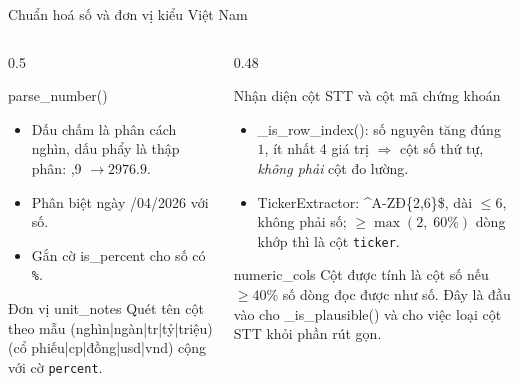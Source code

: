\documentclass[aspectratio=169,11pt]{beamer}
\newcommand{\src}[1]{{\footnotesize\ttfamily #1}}
\begin{document}
\begin{frame}{Chuẩn hoá số và đơn vị kiểu Việt Nam}
  \begin{columns}[T]
    \begin{column}{0.5\textwidth}
      \begin{block}{\small \src{parse\_number()}}
        \begin{itemize}\footnotesize
          \item Dấu chấm là phân cách nghìn, dấu phẩy là thập phân:
                \src{2.976,9} $\rightarrow 2976.9$.
          \item Phân biệt ngày \src{22/04/2026} với số.
          \item Gắn cờ \src{is\_percent} cho số có \texttt{\%}.
        \end{itemize}
      \end{block}
      \begin{block}{\small Đơn vị \src{unit\_notes}}
        Quét tên cột theo mẫu \src{(nghìn|ngàn|tr|tỷ|triệu) (cổ phiếu|cp|đồng|usd|vnd)}
        cộng với cờ \texttt{percent}.
      \end{block}
    \end{column}
    \begin{column}{0.48\textwidth}
      \begin{block}{\small Nhận diện cột STT và cột mã chứng khoán}
        \begin{itemize}\footnotesize
          \item \src{\_is\_row\_index()}: số nguyên tăng đúng $1$, ít nhất 4 giá trị
                $\Rightarrow$ cột số thứ tự, \emph{không phải} cột đo lường.
          \item \src{TickerExtractor}: \src{\^{}A-ZĐ\{2,6\}\$}, dài $\le 6$, không
                phải số; $\ge \max(2,\;60\%)$ dòng khớp thì là cột \texttt{ticker}.
        \end{itemize}
      \end{block}
      \begin{alertblock}{\small \src{numeric\_cols}}
        Cột được tính là cột số nếu $\ge 40\%$ số dòng đọc được như số. Đây là đầu
        vào cho \src{\_is\_plausible()} và cho việc loại cột STT khỏi phần rút gọn.
      \end{alertblock}
    \end{column}
  \end{columns}
\end{frame}
\end{document}
